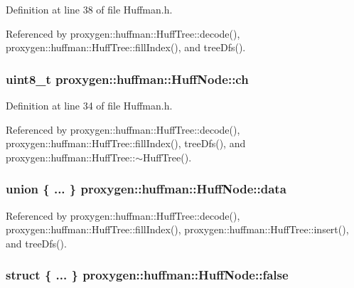 Definition at line 38 of file Huffman.\+h.



Referenced by proxygen\+::huffman\+::\+Huff\+Tree\+::decode(), proxygen\+::huffman\+::\+Huff\+Tree\+::fill\+Index(), and tree\+Dfs().

\subsubsection[{ch}]{\setlength{\rightskip}{0pt plus 5cm}uint8\+\_\+t proxygen\+::huffman\+::\+Huff\+Node\+::ch}\label{structproxygen_1_1huffman_1_1HuffNode_aedb703c51ab6bf46a2510dd9bf1f430a}


Definition at line 34 of file Huffman.\+h.



Referenced by proxygen\+::huffman\+::\+Huff\+Tree\+::decode(), proxygen\+::huffman\+::\+Huff\+Tree\+::fill\+Index(), tree\+Dfs(), and proxygen\+::huffman\+::\+Huff\+Tree\+::$\sim$\+Huff\+Tree().

\subsubsection[{data}]{\setlength{\rightskip}{0pt plus 5cm}union \{ ... \}   proxygen\+::huffman\+::\+Huff\+Node\+::data}\label{structproxygen_1_1huffman_1_1HuffNode_a32f743d26ee70b7b39e5348e16658ca3}


Referenced by proxygen\+::huffman\+::\+Huff\+Tree\+::decode(), proxygen\+::huffman\+::\+Huff\+Tree\+::fill\+Index(), proxygen\+::huffman\+::\+Huff\+Tree\+::insert(), and tree\+Dfs().

\subsubsection[{false}]{\setlength{\rightskip}{0pt plus 5cm}struct \{ ... \}  proxygen\+::huffman\+::\+Huff\+Node\+::false}\label{structproxygen_1_1huffman_1_1HuffNode_a2230ac1f1487bd01d428f5c3bf04a4db}
